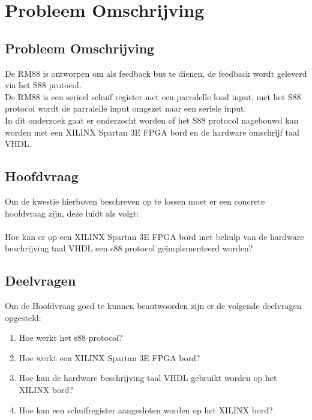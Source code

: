 \chapter{Probleem Omschrijving}
\section{Probleem Omschrijving}

De RM88 is ontworpen om als feedback bus te dienen, de feedback wordt geleverd via het S88 protocol.\\
De RM88 is een serieel schuif register met een parralelle load input, met het S88 protocol wordt de parralelle input omgezet naar een seriele input.\\
In dit onderzoek gaat er onderzocht worden of het S88 protocol nagebouwd kan worden met een XILINX Spartan 3E FPGA bord en de hardware omschrijf taal VHDL.


\section{Hoofdvraag}
Om de kwestie hierboven beschreven op te lossen moet er een concrete hoofdvraag zijn, deze luidt als volgt: \\\\
Hoe kan er op een XILINX Spartan 3E FPGA bord met behulp van de hardware beschrijving taal VHDL een s88 protocol geïmplementeerd worden?
\\

\section{Deelvragen}
Om de Hoofdvraag goed te kunnen beantwoorden zijn er de volgende deelvragen opgesteld:

\begin{enumerate}
	\item Hoe werkt het s88 protocol?
	\item Hoe werkt een XILINX Spartan 3E FPGA bord?
	\item Hoe kan de hardware beschrijving taal VHDL gebruikt worden op het XILINX bord?
	\item Hoe kan een schuifregister aangesloten worden op het XILINX bord?
\end{enumerate}